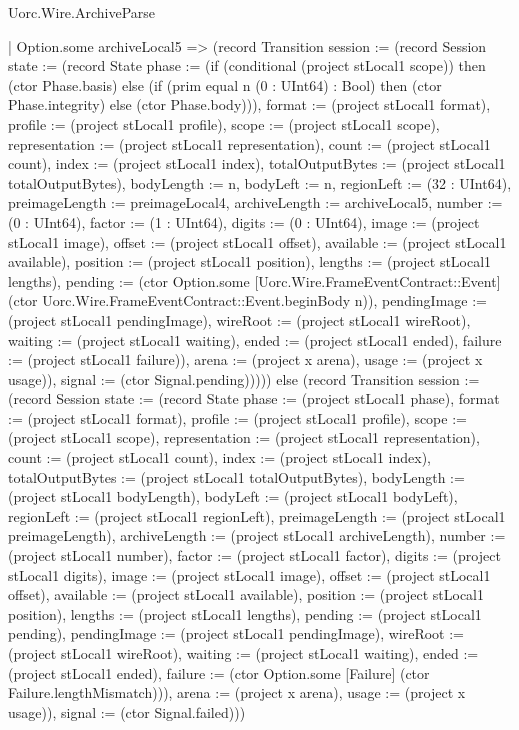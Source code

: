 \begin{lexlean}{Uorc.Wire.ArchiveParse}
\begin{semanticmodule}
{          | Option.some archiveLocal5 => (record Transition {session := (record Session {state := (record State {phase := (if (conditional (project stLocal1 scope)) then (ctor Phase.basis) else (if (prim equal n (0 : UInt64) : Bool) then (ctor Phase.integrity) else (ctor Phase.body))), format := (project stLocal1 format), profile := (project stLocal1 profile), scope := (project stLocal1 scope), representation := (project stLocal1 representation), count := (project stLocal1 count), index := (project stLocal1 index), totalOutputBytes := (project stLocal1 totalOutputBytes), bodyLength := n, bodyLeft := n, regionLeft := (32 : UInt64), preimageLength := preimageLocal4, archiveLength := archiveLocal5, number := (0 : UInt64), factor := (1 : UInt64), digits := (0 : UInt64), image := (project stLocal1 image), offset := (project stLocal1 offset), available := (project stLocal1 available), position := (project stLocal1 position), lengths := (project stLocal1 lengths), pending := (ctor Option.some [Uorc.Wire.FrameEventContract::Event] (ctor Uorc.Wire.FrameEventContract::Event.beginBody n)), pendingImage := (project stLocal1 pendingImage), wireRoot := (project stLocal1 wireRoot), waiting := (project stLocal1 waiting), ended := (project stLocal1 ended), failure := (project stLocal1 failure)}), arena := (project x arena), usage := (project x usage)}), signal := (ctor Signal.pending)})))) else (record Transition {session := (record Session {state := (record State {phase := (project stLocal1 phase), format := (project stLocal1 format), profile := (project stLocal1 profile), scope := (project stLocal1 scope), representation := (project stLocal1 representation), count := (project stLocal1 count), index := (project stLocal1 index), totalOutputBytes := (project stLocal1 totalOutputBytes), bodyLength := (project stLocal1 bodyLength), bodyLeft := (project stLocal1 bodyLeft), regionLeft := (project stLocal1 regionLeft), preimageLength := (project stLocal1 preimageLength), archiveLength := (project stLocal1 archiveLength), number := (project stLocal1 number), factor := (project stLocal1 factor), digits := (project stLocal1 digits), image := (project stLocal1 image), offset := (project stLocal1 offset), available := (project stLocal1 available), position := (project stLocal1 position), lengths := (project stLocal1 lengths), pending := (project stLocal1 pending), pendingImage := (project stLocal1 pendingImage), wireRoot := (project stLocal1 wireRoot), waiting := (project stLocal1 waiting), ended := (project stLocal1 ended), failure := (ctor Option.some [Failure] (ctor Failure.lengthMismatch))}), arena := (project x arena), usage := (project x usage)}), signal := (ctor Signal.failed)}))
}
\end{semanticmodule}
\end{lexlean}
